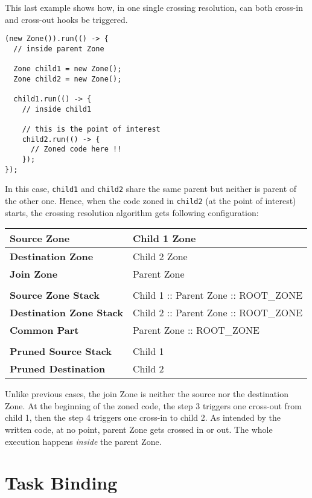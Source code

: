 This last example shows how, in one single crossing resolution, can both cross-in and cross-out hooks be triggered.

\begin{lstlisting}
(new Zone()).run(() -> {
  // inside parent Zone

  Zone child1 = new Zone();
  Zone child2 = new Zone();

  child1.run(() -> {
    // inside child1
    
    // this is the point of interest
    child2.run(() -> {
      // Zoned code here !!
    });
});
\end{lstlisting}

In this case, \lstinline{child1} and \lstinline{child2} share the same parent but neither is parent of the other one. Hence, when the code zoned in \lstinline{child2} (at the point of interest) starts, the crossing resolution algorithm gets following configuration:

\begin{tabular}{| l | l |}
\hline
\textbf{Source Zone} & Child 1 Zone
\\ \hline
\textbf{Destination Zone} & Child 2 Zone
\\ \hline
\textbf{Join Zone} & Parent Zone
\\ \hline
\multicolumn{2}{l}{}
\\ \hline
\textbf{Source Zone Stack} & Child 1 :: Parent Zone :: ROOT\_ZONE
\\ \hline
\textbf{Destination Zone Stack} & Child 2 :: Parent Zone :: ROOT\_ZONE
\\ \hline
\textbf{Common Part} & Parent Zone :: ROOT\_ZONE
\\ \hline
\multicolumn{2}{l}{}
\\ \hline
\textbf{Pruned Source Stack} & Child 1
\\ \hline
\textbf{Pruned Destination} & Child 2
\\ \hline
\end{tabular}

Unlike previous cases, the join Zone is neither the source nor the destination Zone. At the beginning of the zoned code, the step 3 triggers one cross-out from child 1, then the step 4 triggers one cross-in to child 2. As intended by the written code, at no point, parent Zone gets crossed in or out. The whole execution happens \emph{inside} the parent Zone.

\section{Task Binding}

